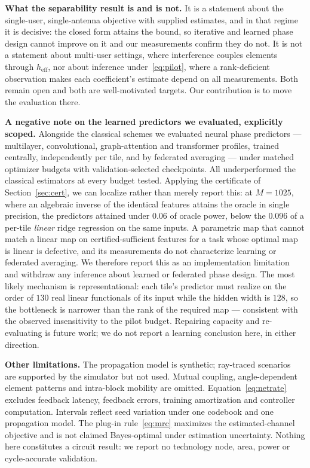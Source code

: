 \documentclass[journal]{IEEEtran}
\begin{document}
\textbf{What the separability result is and is not.} It is a statement about the single-user, single-antenna objective with supplied estimates, and in that regime it is decisive: the closed form attains the bound, so iterative and learned phase design cannot improve on it and our measurements confirm they do not. It is not a statement about multi-user settings, where interference couples elements through $h_{\mathrm{eff}}$, nor about inference under~\eqref{eq:pilot}, where a rank-deficient observation makes each coefficient's estimate depend on all measurements. Both remain open and both are well-motivated targets. Our contribution is to move the evaluation there.

\textbf{A negative note on the learned predictors we evaluated, explicitly scoped.} Alongside the classical schemes we evaluated neural phase predictors --- multilayer, convolutional, graph-attention and transformer profiles, trained centrally, independently per tile, and by federated averaging --- under matched optimizer budgets with validation-selected checkpoints. All underperformed the classical estimators at every budget tested. Applying the certificate of Section~\ref{sec:cert}, we can localize rather than merely report this: at $M=1025$, where an algebraic inverse of the identical features attains the oracle in single precision, the predictors attained under 0.06 of oracle power, below the 0.096 of a per-tile \emph{linear} ridge regression on the same inputs. A parametric map that cannot match a linear map on certified-sufficient features for a task whose optimal map is linear is defective, and its measurements do not characterize learning or federated averaging. We therefore report this as an implementation limitation and withdraw any inference about learned or federated phase design. The most likely mechanism is representational: each tile's predictor must realize on the order of $130$ real linear functionals of its input while the hidden width is $128$, so the bottleneck is narrower than the rank of the required map --- consistent with the observed insensitivity to the pilot budget. Repairing capacity and re-evaluating is future work; we do not report a learning conclusion here, in either direction.

\textbf{Other limitations.} The propagation model is synthetic; ray-traced scenarios~\cite{alkhateeb2019} are supported by the simulator but not used. Mutual coupling, angle-dependent element patterns and intra-block mobility are omitted. Equation~\eqref{eq:netrate} excludes feedback latency, feedback errors, training amortization and controller computation. Intervals reflect seed variation under one codebook and one propagation model. The plug-in rule~\eqref{eq:mrc} maximizes the estimated-channel objective and is not claimed Bayes-optimal under estimation uncertainty. Nothing here constitutes a circuit result: we report no technology node, area, power or cycle-accurate validation.
\end{document}
